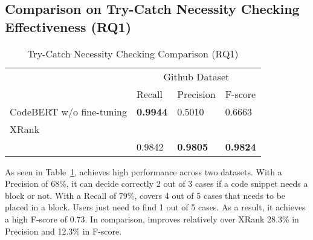 \subsection{Comparison on Try-Catch Necessity Checking Effectiveness (RQ1)}

\begin{table}[t]%
  \caption{Try-Catch Necessity Checking Comparison (RQ1)}
  \vspace{-12pt}
  \small
	\begin{center}
		\renewcommand{\arraystretch}{1}
		\begin{tabular}{| p{3.05cm}<{\centering} | p{0.90cm}<{\centering} | p{0.90cm}<{\centering}| p{0.90cm}<{\centering}|}
		  \hline
			\multirow{2}{*}{} & \multicolumn{3}{c|}{Github Dataset} \\
			\cline{2-4}
			  & Recall  & Precision & F-score \\
			\hline
			CodeBERT w/o fine-tuning &  \textbf{0.9944} & 0.5010  & 0.6663\\
			\hline
			XRank &  &  & \\
			\hline
			\tool   & 0.9842  &  \textbf{0.9805} & \textbf{0.9824}\\
			\hline
		\end{tabular}
		\label{tab:xblock}
	\end{center}
\end{table}



As seen in Table~\ref{tab:xblock}, {\tool} achieves high performance
across two datasets. With a Precision of 68\%, it can decide correctly
2 out of 3 cases if a code snippet needs a 
block or not. With a Recall of 79\%, {\tool} covers 4 out of
5 cases that needs to be placed in a  block. Users
just need to find 1 out of 5 cases. As a result, it achieves a high
F-score of 0.73.
In comparison, {\tool} improves relatively over XRank 28.3\% in
Precision and 12.3\% in F-score.


